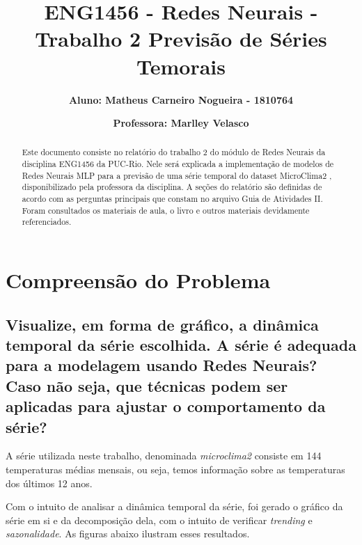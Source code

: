 \documentclass[12pt]{article}
\title{\textbf{ENG1456 - Redes Neurais - Trabalho 2 Previsão de Séries Temorais}}
\author{\textbf{Aluno: Matheus Carneiro Nogueira - 1810764}}
\affil{}
\author{\textbf{Professora: Marlley Velasco}}
\affil{}
\date{}
\begin{document}
	\maketitle
	\tableofcontents
	
	
	\begin{abstract}
		Este documento consiste no relatório do trabalho 2 do módulo de Redes Neurais da disciplina ENG1456 da PUC-Rio. Nele será explicada a implementação de modelos de Redes Neurais MLP para a previsão de uma série temporal do dataset MicroClima2 , disponibilizado pela professora da disciplina. A seções do relatório são definidas de acordo com as perguntas principais que constam no arquivo Guia de Atividades II. Foram consultados os materiais de aula, o livro \cite{livro} e outros materiais devidamente referenciados.
	\end{abstract}
		
	\section{Compreensão do Problema}
	\subsection{Visualize, em forma de gráfico, a dinâmica temporal da série escolhida. A série é adequada para a modelagem usando Redes Neurais? Caso não seja, que técnicas podem ser aplicadas para ajustar o comportamento da série?}\label{subsec:1.1}
	
	A série utilizada neste trabalho, denominada \textit{microclima2} consiste em 144 temperaturas médias mensais, ou seja, temos informação sobre as temperaturas dos últimos 12 anos.
	
	Com o intuito de analisar a dinâmica temporal da série, foi gerado o gráfico da série em si e da decomposição dela, com o intuito de verificar \textit{trending} e \textit{sazonalidade}. As figuras abaixo ilustram esses resultados.
	
\end{document}
